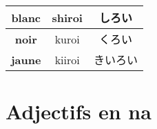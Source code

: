 \documentclass[11pt]{report}
\newenvironment{Japanese}{%
\CJKfamily{min}%
\CJKtilde  
\CJKnospace}{}
\begin{document}
\begin{CJK}{UTF8}{}
\begin{Japanese}
\begin{center}
\begin{tabular}{|c|c|c|}
			\hline
			\textbf{blanc} & shiroi & \textcolor[rgb]{0.75,0.75,0.75}{しろい} \\
			\hline
			\textbf{noir} & kuroi & \textcolor{black}{くろい} \\
			\hline
			\textbf{jaune} & kiiroi & \textcolor[rgb]{0.9,0.8,0}{きいろい} \\
			\hline
		\end{tabular}
	\end{center}
\end{Japanese}  
\end{CJK}

\chapter{Adjectifs en na}
\end{document}
